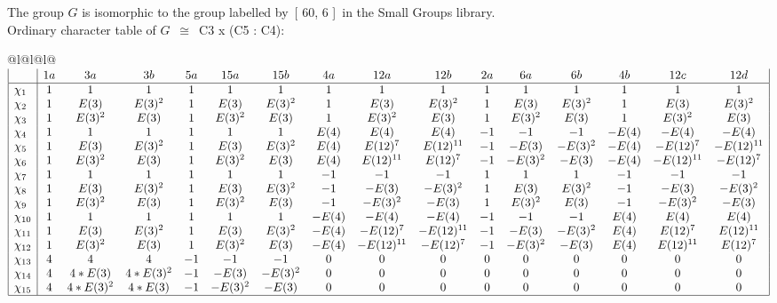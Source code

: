 \documentclass[varwidth=\maxdimen,border=10]{standalone}
\begin{document}
The group $G$ is isomorphic to the group labelled by\ [ 60, 6 ]\ in the Small Groups library.\\
Ordinary character table of $G$\ $\cong$\ C3 x (C5 : C4):\\
\begin{center}
\begin{tabular}{@{}l@{}l@{}l@{}}
\hline
\(\begin{array}{|l|ccccccccccccccc|}
  & 1a & 3a & 3b & 5a & 15a & 15b & 4a & 12a & 12b & 2a & 6a & 6b & 4b & 12c & 12d\\ \hline
\chi_{1} & 1 & 1 & 1 & 1 & 1 & 1 & 1 & 1 & 1 & 1 & 1 & 1 & 1 & 1 & 1\\
\chi_{2} & 1 & E(3) & E(3)^{2} & 1 & E(3) & E(3)^{2} & 1 & E(3) & E(3)^{2} & 1 & E(3) & E(3)^{2} & 1 & E(3) & E(3)^{2}\\
\chi_{3} & 1 & E(3)^{2} & E(3) & 1 & E(3)^{2} & E(3) & 1 & E(3)^{2} & E(3) & 1 & E(3)^{2} & E(3) & 1 & E(3)^{2} & E(3)\\
\chi_{4} & 1 & 1 & 1 & 1 & 1 & 1 & E(4) & E(4) & E(4) & -1 & -1 & -1 & -E(4) & -E(4) & -E(4)\\
\chi_{5} & 1 & E(3) & E(3)^{2} & 1 & E(3) & E(3)^{2} & E(4) & E(12)^{7} & E(12)^{11} & -1 & -E(3) & -E(3)^{2} & -E(4) & -E(12)^{7} & -E(12)^{11}\\
\chi_{6} & 1 & E(3)^{2} & E(3) & 1 & E(3)^{2} & E(3) & E(4) & E(12)^{11} & E(12)^{7} & -1 & -E(3)^{2} & -E(3) & -E(4) & -E(12)^{11} & -E(12)^{7}\\
\chi_{7} & 1 & 1 & 1 & 1 & 1 & 1 & -1 & -1 & -1 & 1 & 1 & 1 & -1 & -1 & -1\\
\chi_{8} & 1 & E(3) & E(3)^{2} & 1 & E(3) & E(3)^{2} & -1 & -E(3) & -E(3)^{2} & 1 & E(3) & E(3)^{2} & -1 & -E(3) & -E(3)^{2}\\
\chi_{9} & 1 & E(3)^{2} & E(3) & 1 & E(3)^{2} & E(3) & -1 & -E(3)^{2} & -E(3) & 1 & E(3)^{2} & E(3) & -1 & -E(3)^{2} & -E(3)\\
\chi_{10} & 1 & 1 & 1 & 1 & 1 & 1 & -E(4) & -E(4) & -E(4) & -1 & -1 & -1 & E(4) & E(4) & E(4)\\
\chi_{11} & 1 & E(3) & E(3)^{2} & 1 & E(3) & E(3)^{2} & -E(4) & -E(12)^{7} & -E(12)^{11} & -1 & -E(3) & -E(3)^{2} & E(4) & E(12)^{7} & E(12)^{11}\\
\chi_{12} & 1 & E(3)^{2} & E(3) & 1 & E(3)^{2} & E(3) & -E(4) & -E(12)^{11} & -E(12)^{7} & -1 & -E(3)^{2} & -E(3) & E(4) & E(12)^{11} & E(12)^{7}\\
\chi_{13} & 4 & 4 & 4 & -1 & -1 & -1 & 0 & 0 & 0 & 0 & 0 & 0 & 0 & 0 & 0\\
\chi_{14} & 4 & 4*E(3) & 4*E(3)^{2} & -1 & -E(3) & -E(3)^{2} & 0 & 0 & 0 & 0 & 0 & 0 & 0 & 0 & 0\\
\chi_{15} & 4 & 4*E(3)^{2} & 4*E(3) & -1 & -E(3)^{2} & -E(3) & 0 & 0 & 0 & 0 & 0 & 0 & 0 & 0 & 0\\
\hline
\end{array}\)\\
\end{tabular}
\end{center}
\end{document}

